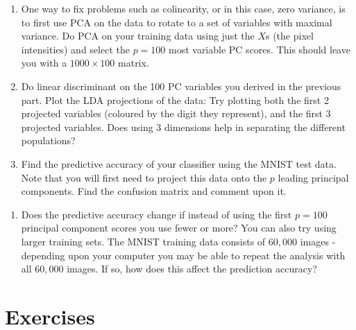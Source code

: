 \documentclass[
]{book}
\newenvironment{Shaded}{\begin{snugshade}}{\end{snugshade}}
\newcommand{\FunctionTok}[1]{\textcolor[rgb]{0.00,0.00,0.00}{#1}}
\newcommand{\NormalTok}[1]{#1}
\newcommand{\OtherTok}[1]{\textcolor[rgb]{0.56,0.35,0.01}{#1}}
\newcommand{\SpecialCharTok}[1]{\textcolor[rgb]{0.00,0.00,0.00}{#1}}
\providecommand{\tightlist}{%
  \setlength{\itemsep}{0pt}\setlength{\parskip}{0pt}}
\theoremstyle{definition}
\theoremstyle{definition}
\theoremstyle{definition}
\theoremstyle{definition}
\theoremstyle{remark}
\begin{document}
\begin{enumerate}
\def\labelenumi{\roman{enumi}.}
\setcounter{enumi}{1}
\item
  One way to fix problems such as colinearity, or in this case, zero variance, is to first use PCA on the data to rotate to a set of variables with maximal variance. Do PCA on your training data using just the \(X\)s (the pixel intensities) and select the \(p=100\) most variable PC scores. This should leave you with a \(1000 \times 100\) matrix.
\item
  Do linear discriminant on the 100 PC variables you derived in the previous part. Plot the LDA projections of the data: Try plotting both the first 2 projected variables (coloured by the digit they represent), and the first 3 projected variables.
  Does using 3 dimensions help in separating the different populations?
\item
  Find the predictive accuracy of your classifier using the MNIST test data. Note that you will first need to project this data onto the \(p\) leading principal components. Find the confusion matrix and comment upon it.
\end{enumerate}

\begin{Shaded}
\end{Shaded}

\begin{enumerate}
\def\labelenumi{\alph{enumi}.}
\setcounter{enumi}{21}
\tightlist
\item
  Does the predictive accuracy change if instead of using the first \(p=100\) principal component scores you use fewer or more? You can also try using larger training sets. The MNIST training data consists of \(60,000\) images - depending upon your computer you may be able to repeat the analysis with all \(60,000\) images. If so, how does this affect the prediction accuracy?
\end{enumerate}

\hypertarget{exercises-5}{%
\section{Exercises}\label{exercises-5}}
\end{document}
